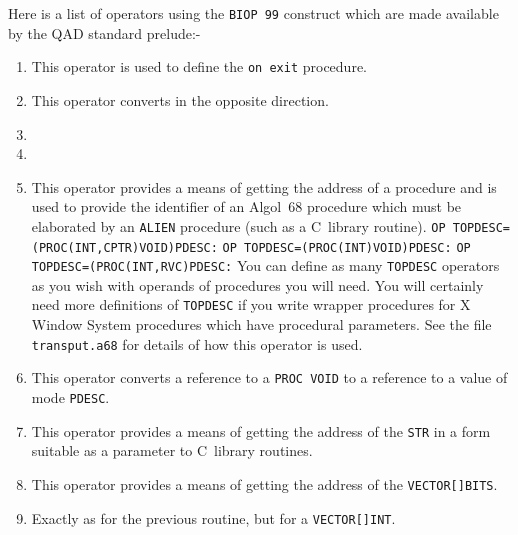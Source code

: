 Here is a list of operators using the \verb|BIOP 99| construct which
are made available by the QAD standard prelude:-
\begin{enumerate}
\item {}\newline
This operator is used to define the \verb|on exit| procedure.
\item {}\newline
This operator converts in the opposite direction.
\item {}
\item {}
\item {}\newline
This operator provides a means of getting the address of a procedure
and is used to provide the identifier of an Algol~68 procedure which
must be elaborated by an \verb|ALIEN| procedure (such as a C~library
routine).\newline
\verb|OP TOPDESC=(PROC(INT,CPTR)VOID)PDESC:|\newline
\verb|OP TOPDESC=(PROC(INT)VOID)PDESC:|\newline
\verb|OP TOPDESC=(PROC(INT,RVC)PDESC:|\newline
You can define as many \verb|TOPDESC| operators as you wish with
operands of procedures you will need. You will certainly need more
definitions of \verb|TOPDESC| if you write wrapper procedures for X
Window System procedures which have procedural parameters. See the file
\verb|transput.a68| for details of how this operator is used.
\item {}\newline
This operator converts a reference to a \verb|PROC VOID| to a
reference to a value of mode \verb|PDESC|.
\item {}\newline
This operator provides a means of getting the address of the
\verb|STR| in a form suitable as a parameter to C~library routines.
\item {}\newline
This operator provides a means of getting the address of the
\verb|VECTOR[]BITS|.
\item {}\newline
Exactly as for the previous routine, but for a \verb|VECTOR[]INT|.
\end{enumerate}

